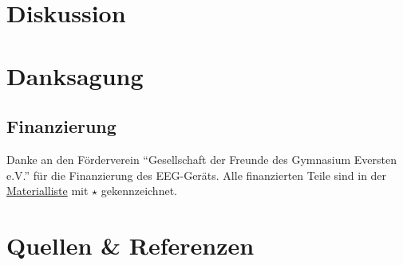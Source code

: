 \documentclass{scrartcl}
\begin{document}
	\section{Diskussion}

	\section{Danksagung}

	\subsection{Finanzierung} \label{Foerderverein}

	Danke an den Förderverein \enquote{Gesellschaft der Freunde des Gymnasium Eversten e.V.} für die Finanzierung des EEG-Geräts. Alle finanzierten Teile sind in der \hyperref[Materialien]{Materialliste} mit $\star$ gekennzeichnet.

	\section{Quellen \& Referenzen}
\end{document}
